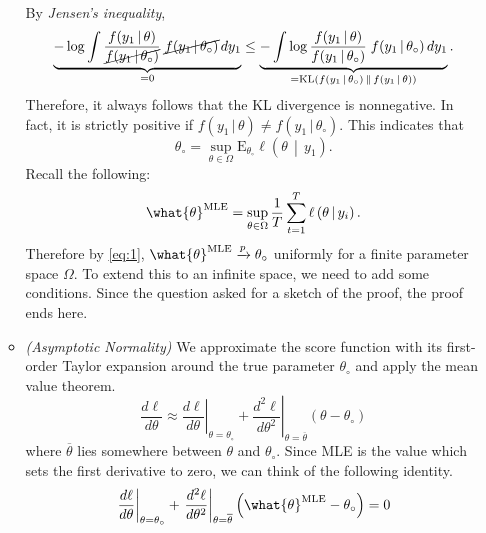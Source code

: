 \documentclass[answers]{exam}
\begin{document}
\begin{questions}
\begin{solution}
\begin{enumerate}[a)]
\begin{itemize}
\begin{align}
        \end{align}
        By \emph{Jensen's inequality},
        \begin{equation}
          \underbrace{-\log\int \dfrac{f(y_{1}\,|\,\theta)}{\cancel{f(y_{1}\,|\,\theta_{\circ})}}\; \cancel{f(y_{1}\,|\,\theta_{\circ})}\,dy_{1}}_{=0} \leq \underbrace{-\int \log \dfrac{f(y_{1}\,|\,\theta)}{f(y_{1}\,|\,\theta_{\circ})}\; f(y_{1}\,|\,\theta_{\circ})\,dy_{1}}_{=\mathrm{KL}\left(f(y_{1}\,|\,\theta_{\circ})\,\middle\|\,f(y_{1}\,|\,\theta)\right) }.
        \end{equation}
        Therefore, it always follows that the KL divergence is nonnegative. In fact, it is strictly positive if $f(y_{1}\,|\,\theta)\neq f(y_{1}\,|\,\theta_{\circ})$.
      This indicates that
      \begin{equation}
        \theta_{\circ} = \sup_{\theta\in\Omega}\mathrm{E}_{\theta_{\circ}}\ell\left(\theta\,\middle|\,y_{1}\right).
      \end{equation}
      Recall the following:
      \begin{equation}
        \what{\theta}^{\text{MLE}} = \sup_{\theta\in\Omega}\dfrac{1}{T}\sum_{t=1}^{T}\ell\left(\theta\,\middle|\,y_{i}\right).
      \end{equation}
      Therefore by \ref{eq:1}, $\what{\theta}^{\text{MLE}}\xrightarrow{p} \theta_{\circ}$ uniformly for a finite parameter space $\Omega$. To extend this to an infinite space, we need to add some conditions. Since the question asked for a sketch of the proof, the proof ends here.
      \item \emph{(Asymptotic Normality)} We approximate the score function with its first-order Taylor expansion around the true parameter $\theta_{\circ}$ and apply the mean value theorem.
      \begin{equation}
        \dfrac{d\ell}{d\theta} \approx \left.\dfrac{d\ell}{d\theta}\right|_{\theta=\theta_{\circ}}+\left.\dfrac{d^{2}\ell}{d\theta^{2}}\right|_{\theta=\overline{\theta}}\left(\theta-\theta_{\circ}\right)
      \end{equation}
      where $\overline{\theta}$ lies somewhere between $\theta$ and $\theta_{\circ}$. Since MLE is the value which sets the first derivative to zero, we can think of the following identity.
      \begin{equation}
        \left.\dfrac{d\ell}{d\theta}\right|_{\theta=\theta_{\circ}}+\left.\dfrac{d^{2}\ell}{d\theta^{2}}\right|_{\theta=\overline{\theta}}\left(\what{\theta}^{\text{MLE}}-\theta_{\circ}\right)=0
      \end{equation}

\end{itemize}
\end{enumerate}
\end{solution}
\end{questions}
\end{document}
